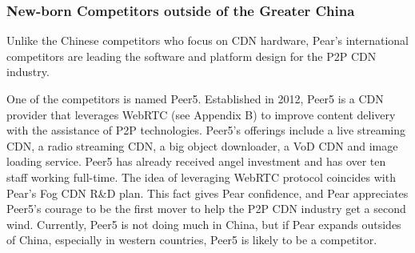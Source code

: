 \subsubsection{New-born Competitors outside of the Greater China}
Unlike the Chinese competitors who focus on CDN hardware, Pear's international competitors are leading the software and platform design for the P2P CDN industry.

One of the competitors is named Peer5. Established in 2012, Peer5 is a CDN provider that leverages WebRTC (see Appendix B) to improve content delivery with the assistance of P2P technologies. Peer5's offerings include a live streaming CDN, a radio streaming CDN, a big object downloader, a VoD CDN and image loading service. Peer5 has already received angel investment and has over ten staff working full-time. The idea of leveraging WebRTC protocol coincides with Pear's Fog CDN R\&D plan. This fact gives Pear confidence, and Pear appreciates Peer5's courage to be the first mover to help the P2P CDN industry get a second wind. Currently, Peer5 is not doing much in China, but if Pear expands outsides of China, especially in western countries, Peer5 is likely to be a competitor.

